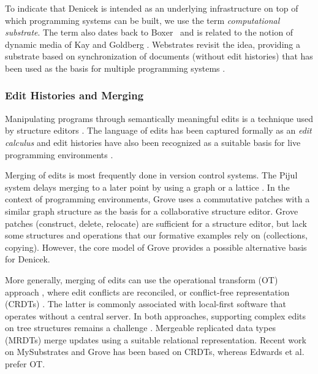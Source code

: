 \documentclass[sigconf]{acmart}
\newcommand{\diff}[1]{{#1}}
\newcommand{\note}[1]{}
\begin{document}
To indicate that Denicek is intended as an underlying infrastructure on top of which programming
systems can be built, we use the term \emph{computational substrate}. The term also dates back to
Boxer~\cite{disessa-1995-epistemology} and is related to the notion of dynamic media of Kay and
Goldberg \cite{kay-1977-media}. Webstrates \cite{klokmose-2015-webstrates}
revisit the idea, providing a substrate based on synchronization of documents (without edit
histories) that has been used as the basis for multiple programming systems \cite{radle-2017-codestrates,borowski-2022-varv}.

\subsubsection*{Edit Histories and Merging}
Manipulating programs through semantically meaningful edits is a technique used by structure
editors \cite{teitelbaum-1981-cps,hempel-2018-deuce,beckman-2023-sandblocks}. The language of
edits has been captured formally as an \emph{edit calculus} \cite{omar-2017-hazelnut} and
edit histories have also been recognized as a suitable basis for live programming environments \cite{storm-2013-deltas}.

Merging of edits is most frequently done in version control systems. The
Pijul system \cite{meunier-2024-pijul} delays merging to a later point
by using a graph or a lattice \cite{schurmann-2022-merging}. In the context of
programming environments, Grove \cite{adams-2025-grove} uses a commutative patches with a similar graph
structure as the basis for a collaborative structure editor. \diff{Grove patches
(construct, delete, relocate) are sufficient for a structure editor, but lack some structures and
operations that our formative examples rely on (collections, copying). However, the core model
of Grove provides a possible alternative basis for Denicek.}
\note{Added why Grove cannot be used directly by Denicek, but is interesting direction.}

More generally, merging of edits can use the operational transform (OT) approach
\cite{davis-2002-otsgml}, where edit conflicts are reconciled, or conflict-free
representation (CRDTs) \cite{shapiro-2011-crdts,litt-2022-peritext}. The latter is commonly associated
with local-first software \cite{kleppmann-2019-local} that operates without a central server.
In both approaches, supporting complex edits on tree structures
remains a challenge \cite{jungnickel-2016-otjson,da-2024-jsoncrdt}. Mergeable replicated data
types (MRDTs) \cite{kaki-2019-mrdts} merge updates using a suitable relational
representation. Recent work on MySubstrates and Grove \cite{adams-2025-grove,klokmose-2024-mywebstrates}
has been based on CRDTs, whereas Edwards et al. \cite{edwards-2021-typed} prefer OT.
\end{document}
